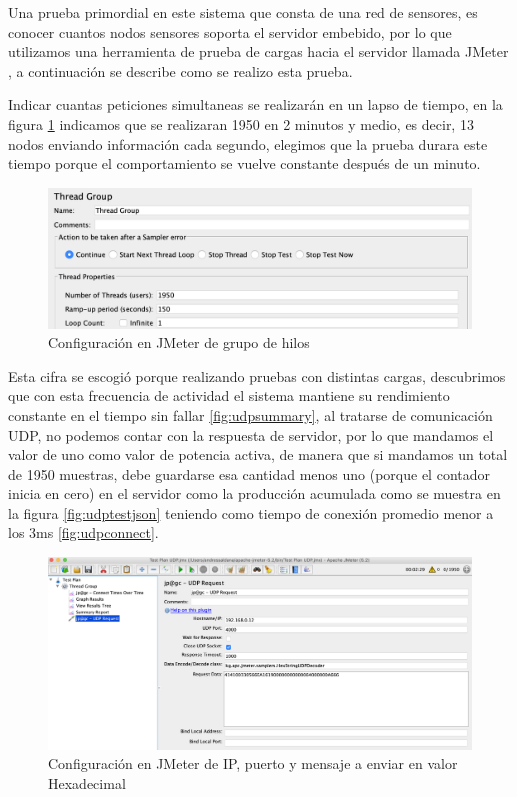 Una prueba primordial en este sistema que consta de una red de sensores, es conocer cuantos nodos sensores soporta el servidor embebido, por lo que utilizamos una herramienta de prueba de cargas hacia el servidor llamada JMeter \citep{JMeter}, a continuación se describe como se realizo esta prueba.

Indicar cuantas peticiones simultaneas se realizarán en un lapso de tiempo, en la figura \ref{fig:threadgroup} indicamos que se realizaran 1950 en 2 minutos y medio, es decir, 13 nodos enviando información cada segundo, elegimos que la prueba durara este tiempo porque el comportamiento se vuelve constante después de un minuto.

\begin{figure}[H]
	\centering
	\includegraphics[scale=.3]{Capitulo5/images/tread_group.png}
	\caption{Configuración en JMeter de grupo de hilos}
	\label{fig:threadgroup}
\end{figure} 

Esta cifra se escogió porque realizando pruebas con distintas cargas, descubrimos que con esta frecuencia de actividad el sistema mantiene su rendimiento constante en el tiempo sin fallar \ref{fig:udpsummary}, al tratarse de comunicación UDP, no podemos contar con la respuesta de servidor, por lo que mandamos el valor de uno como valor de potencia activa, de manera que si mandamos un total de 1950 muestras, debe guardarse esa cantidad menos uno (porque el contador inicia en cero) en el servidor como la producción acumulada como se muestra en la figura \ref{fig:udptestjson} teniendo como tiempo de conexión promedio menor a los 3ms \ref{fig:udpconnect}.

\begin{figure}[H]
	\centering
	\includegraphics[scale=.3]{Capitulo5/images/udp_test_config.png}
	\caption{Configuración en JMeter de IP, puerto y mensaje a enviar en valor Hexadecimal}
	\label{fig:uddpconfig}
\end{figure} 

